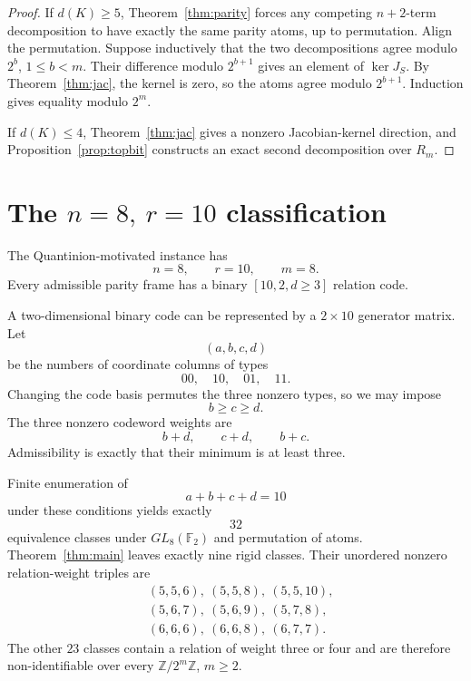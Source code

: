 \documentclass[11pt]{article}
\theoremstyle{definition}
\newcommand{\F}{\mathbb F}
\newcommand{\Z}{\mathbb Z}
\begin{document}
\begin{proof}
If \(d(K)\ge5\), Theorem~\ref{thm:parity} forces any competing \(n+2\)-term decomposition to have exactly the same parity atoms, up to permutation. Align the permutation. Suppose inductively that the two decompositions agree modulo \(2^b\), \(1\le b<m\). Their difference modulo \(2^{b+1}\) gives an element of \(\ker J_S\). By Theorem~\ref{thm:jac}, the kernel is zero, so the atoms agree modulo \(2^{b+1}\). Induction gives equality modulo \(2^m\).

If \(d(K)\le4\), Theorem~\ref{thm:jac} gives a nonzero Jacobian-kernel direction, and Proposition~\ref{prop:topbit} constructs an exact second decomposition over \(R_m\).
\end{proof}

\section{The \(n=8,\ r=10\) classification}
The Quantinion-motivated instance has
\[
n=8,\qquad r=10,\qquad m=8.
\]
Every admissible parity frame has a binary \([10,2,d\ge3]\) relation code.

A two-dimensional binary code can be represented by a \(2\times10\) generator matrix. Let
\[
(a,b,c,d)
\]
be the numbers of coordinate columns of types
\[
00,\quad10,\quad01,\quad11.
\]
Changing the code basis permutes the three nonzero types, so we may impose
\[
b\ge c\ge d.
\]
The three nonzero codeword weights are
\[
b+d,\qquad c+d,\qquad b+c.
\]
Admissibility is exactly that their minimum is at least three.

Finite enumeration of
\[
a+b+c+d=10
\]
under these conditions yields exactly
\[
32
\]
equivalence classes under \(GL_8(\F_2)\) and permutation of atoms. Theorem~\ref{thm:main} leaves exactly nine rigid classes. Their unordered nonzero relation-weight triples are
\[
\boxed{
\begin{aligned}
&(5,5,6),\ (5,5,8),\ (5,5,10),\\
&(5,6,7),\ (5,6,9),\ (5,7,8),\\
&(6,6,6),\ (6,6,8),\ (6,7,7).
\end{aligned}}
\]
The other \(23\) classes contain a relation of weight three or four and are therefore non-identifiable over every \(\Z/2^m\Z\), \(m\ge2\).
\end{document}
